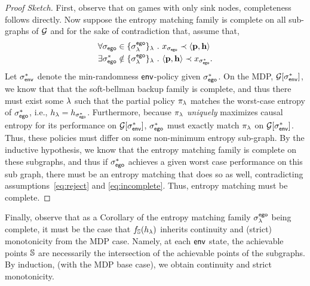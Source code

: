 \begin{proof}[Proof Sketch]
  First, observe that on games with only sink nodes, completeness
  follows directly. Now suppose the entropy matching family is
  complete on all sub-graphs of $\mathcal{G}$ and for the sake of
  contradiction that, assume that,
  \begin{align}
    &\forall \sched_\pOne \in \{\sched^{\pOne}_\rat\}_\rat~.~ x_{\sched_{\pOne}} \prec \langle \scthreshold, \randomness \rangle\label{eq:reject}\\
    &\exists \sched_\pOne^* \notin \{\sched^{\pOne}_\rat\}_\rat~.~  \langle \scthreshold, \randomness \rangle \prec x_{\sched_{\pOne}^*}\label{eq:incomplete}.
  \end{align}
  Let $\sigma_{\mathsf{env}}^*$ denote the min-randomness $\mathsf{env}$-policy given
  $\sigma_{\mathsf{ego}}^*$. On the MDP, $\mathcal{G}[\sigma_{\mathsf{env}}^*]$, we know that
  that the soft-bellman backup family is complete, and thus there must
  exist some $\lambda$ such that the partial policy $\pi_\lambda$ matches
  the worst-case entropy of $\sigma_{\mathsf{ego}}^*$, i.e.,
  $h_\lambda = h_{\sigma_{\mathsf{ego}}^*}$. Furthermore, because
  $\pi_\lambda$ \emph{uniquely} maximizes causal entropy for its
  performance on $\mathcal{G}[\sigma_{\mathsf{env}}^*]$, $\sigma_{\mathsf{ego}}^*$ must exactly
  match $\pi_\lambda$ on $\mathcal{G}[\sigma_{\mathsf{env}}^*]$. Thus, these policies must
  differ on some non-minimum entropy sub-graph. By the inductive
  hypothesis, we know that the entropy matching family is complete on
  these subgraphs, and thus if $\sigma_{\mathsf{ego}}^*$ achieves a given worst
  case performance on this sub graph, there must be an entropy
  matching that does so as well, contradicting
  assumptions~\eqref{eq:reject} and \eqref{eq:incomplete}.  Thus,
  entropy matching must be complete.
\end{proof}

Finally, observe that as a Corollary of the entropy matching family
$\sigma^{\mathsf{ego}}_\lambda$ being complete, it must be the case that
$f_\mathbb{S}(h_\lambda)$ inherits continuity and (strict) monotonicity
from the MDP case. Namely, at each $\mathsf{env}$ state, the achievable
points $\mathbb{S}$ are necessarily the intersection of the achievable
points of the subgraphs. By induction, (with the MDP base case), we
obtain continuity and strict monotonicity.

